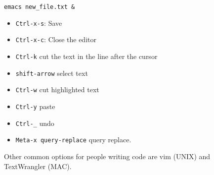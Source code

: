 \documentclass{article}
\begin{document}
\begin{verbatim}
emacs new_file.txt &
\end{verbatim}

\begin{itemize}
\item\verb"Ctrl-x-s": Save
\item\verb"Ctrl-x-c": Close the editor
\item\verb"Ctrl-k" cut the text in the line after the cursor
\item\verb"shift-arrow" select text
\item\verb"Ctrl-w" cut highlighted text
\item\verb"Ctrl-y" paste
\item\verb"Ctrl-_" undo
\item\verb"Meta-x query-replace" query replace.
\end{itemize}

Other common options for people writing code are vim (UNIX) and
TextWrangler (MAC).  
\end{document}
